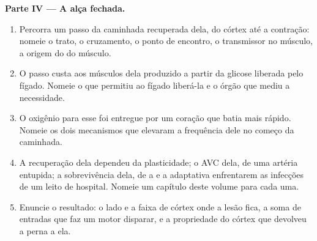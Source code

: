 \begin{problem}
\medskip
\noindent\textbf{Parte IV --- A alça fechada.}
\begin{enumerate}[resume]
  \item Percorra um passo da caminhada recuperada dela, do córtex até a
        contração: nomeie o trato, o cruzamento, o ponto de encontro, o
        transmissor no músculo, a origem do  do músculo.
  \item O passo custa aos músculos dela  produzido a partir da
        glicose liberada pelo fígado. Nomeie o  que permitiu ao
        fígado liberá-la e o órgão que mediu a necessidade.
  \item O oxigênio para esse  foi entregue por um coração que batia
        mais rápido. Nomeie os dois mecanismos que elevaram a
        frequência dele no começo da caminhada.
  \item A recuperação dela dependeu da plasticidade; o AVC dela, de uma
        artéria entupida; a sobrevivência dela, de a  e
        a adaptativa enfrentarem as infecções de um leito de hospital.
        Nomeie um capítulo deste volume para cada uma.
  \item Enuncie o resultado: o lado e a faixa de córtex onde a lesão
        fica, a soma de entradas que faz um  motor disparar, e
        a propriedade do córtex que devolveu a perna a ela.
\end{enumerate}
\end{problem}
